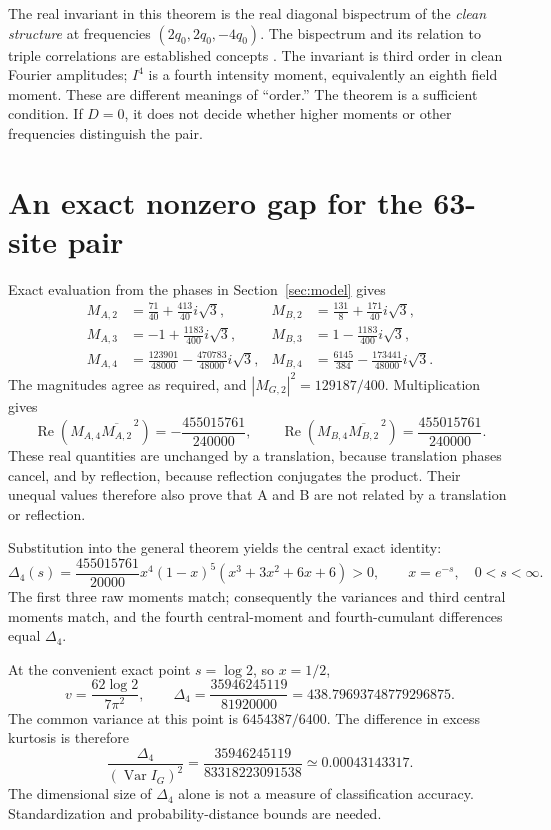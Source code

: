 \documentclass[11pt]{article}
\newcommand{\Var}{\operatorname{Var}}
\newcommand{\Ree}{\operatorname{Re}}
\begin{document}
The real invariant in this theorem is the real diagonal bispectrum of the
\emph{clean structure} at frequencies $(2q_0,2q_0,-4q_0)$. The bispectrum
and its relation to triple correlations are established concepts
\cite{Jaming2003}. The invariant is third order in clean Fourier amplitudes;
$I^4$ is a fourth intensity moment, equivalently an eighth field moment.
These are different meanings of ``order.'' The theorem is a sufficient
condition. If $D=0$, it does not decide whether higher moments or other
frequencies distinguish the pair.

\section{An exact nonzero gap for the 63-site pair}
\label{sec:instance}

Exact evaluation from the phases in Section~\ref{sec:model} gives
\begin{align*}
 M_{A,2}&=\frac{71}{40}+\frac{413}{40}i\sqrt3,&
 M_{B,2}&=\frac{131}{8}+\frac{171}{40}i\sqrt3,\\
 M_{A,3}&=-1+\frac{1183}{400}i\sqrt3,&
 M_{B,3}&=1-\frac{1183}{400}i\sqrt3,\\
 M_{A,4}&=\frac{123901}{48000}-\frac{470783}{48000}i\sqrt3,&
 M_{B,4}&=\frac{6145}{384}-\frac{173441}{48000}i\sqrt3.
\end{align*}
The magnitudes agree as required, and $|M_{G,2}|^2=129187/400$.
Multiplication gives
\[
 \Ree(M_{A,4}\overline{M_{A,2}}^{\,2})
 =-\frac{455015761}{240000},\qquad
 \Ree(M_{B,4}\overline{M_{B,2}}^{\,2})
 =\frac{455015761}{240000}.
\]
These real quantities are unchanged by a translation, because translation
phases cancel, and by reflection, because reflection conjugates the product.
Their unequal values therefore also prove that A and B are not related by a
translation or reflection.

Substitution into the general theorem yields the central exact identity:
\begin{equation}\label{eq:concrete-gap}
 \boxed{\displaystyle
 \Delta_4(s)=\frac{455015761}{20000}
 x^4(1-x)^5(x^3+3x^2+6x+6)>0,
 \qquad x=e^{-s},\quad 0<s<\infty.}
\end{equation}
The first three raw moments match; consequently the variances and third
central moments match, and the fourth central-moment and fourth-cumulant
differences equal $\Delta_4$.

At the convenient exact point $s=\log2$, so $x=1/2$,
\[
 v=\frac{62\log2}{7\pi^2},\qquad
 \Delta_4=\frac{35946245119}{81920000}
 =438.79693748779296875.
\]
The common variance at this point is $6454387/6400$. The difference in
excess kurtosis is therefore
\[
 \frac{\Delta_4}{(\Var I_G)^2}
 =\frac{35946245119}{83318223091538}
 \simeq 0.00043143317.
\]
The dimensional size of $\Delta_4$ alone is not a measure of classification
accuracy. Standardization and probability-distance bounds are needed.
\end{document}
